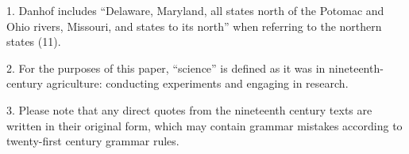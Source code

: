 1. Danhof includes “Delaware, Maryland, all states north of the Potomac and Ohio rivers, Missouri, and states to its north” when referring to the northern states (11).

2. For the purposes of this paper, “science” is defined as it was in nineteenth-century agriculture: conducting experiments and engaging in research.

3. Please note that any direct quotes from the nineteenth century texts are written in their original form, which may contain grammar mistakes according to twenty-first century grammar rules.

